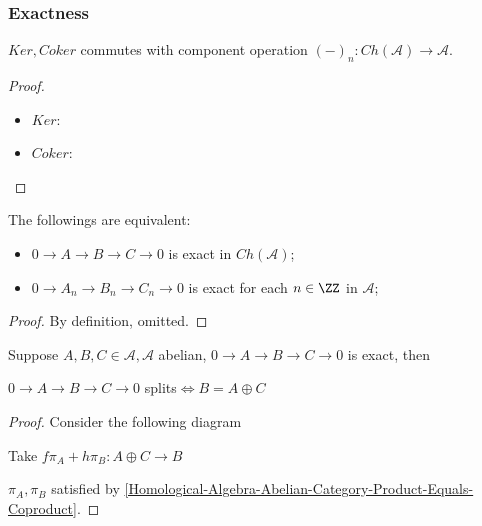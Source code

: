 \documentclass[Total.tex]{subfiles}
\begin{document}
				\subsubsection{Exactness}
				\begin{lemma}
					$Ker,Coker$ commutes with component operation $(-)_n:Ch(\mathcal{A})\rightarrow \mathcal{A}$.
				\end{lemma}
				\begin{proof}
					\begin{itemize}
						\item $Ker$:
						\item $Coker$:
					\end{itemize}
				\end{proof}
				\begin{proposition}
					The followings are equivalent:
					\begin{itemize}
						\item $0\rightarrow A\rightarrow B\rightarrow C\rightarrow0$ is exact in $Ch(\mathcal{A})$;
						\item $0\rightarrow A_n\rightarrow B_n\rightarrow C_n\rightarrow 0$ is exact for each $n\in \ZZ$ in $\mathcal{A}$;
					\end{itemize}
				\end{proposition}
				\begin{proof}
					By definition, omitted.	
				\end{proof}
				
				\begin{proposition}
					Suppose $A,B,C\in \mathcal{A},\mathcal{A}$ abelian, $0\rightarrow A\rightarrow B\rightarrow C\rightarrow 0$ is exact, then
					\begin{center}
						$0\rightarrow A\rightarrow B\rightarrow C\rightarrow 0$ splits$\Leftrightarrow B=A\oplus C$ 
					\end{center}
				\end{proposition}
				\begin{proof}
					Consider the following diagram
					\begin{center}
						Take $f\pi _A+h \pi_B:A\oplus C\rightarrow B$
					\end{center}
					$\pi_A,\pi_B$ satisfied by \ref{Homological-Algebra-Abelian-Category-Product-Equals-Coproduct}.
				\end{proof}
				
\end{document}
